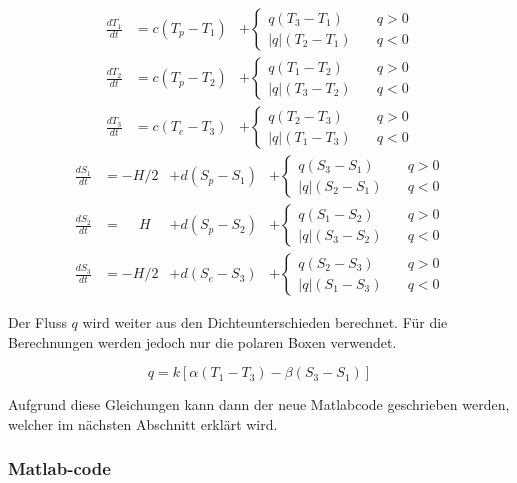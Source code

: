 \begin{equation}
\begin{aligned}
\frac{dT_1}{dt} &= c(T_p-T_1)&+ \begin{cases} q(T_3-T_1) & \quad q>0 \\ |q|(T_2-T_1) & \quad q<0 \end{cases}
\\
\frac{dT_2}{dt} &= c(T_p-T_2)&+\begin{cases} q(T_1-T_2) & \quad q>0 \\ |q|(T_3-T_2) & \quad q<0 \end{cases}
\\
\frac{dT_3}{dt} &= c(T_e-T_3)&+\begin{cases} q(T_2-T_3) & \quad q>0 \\ |q|(T_1-T_3) & \quad q<0 \end{cases}
\end{aligned}
\end{equation}
\begin{equation}
\begin{aligned}
\frac{dS_1}{dt} &= -H/2 &+ d(S_p-S_1)&+\begin{cases} q(S_3-S_1) & \quad q>0 \\ |q|(S_2-S_1) & \quad q<0 \end{cases}
\\
\frac{dS_2}{dt} &= \phantom{-}H &+ d(S_p-S_2)&+\begin{cases} q(S_1-S_2) & \quad q>0 \\ |q|(S_3-S_2) & \quad q<0 \end{cases}	
\\
\frac{dS_3}{dt} &= -H/2 &+d(S_e-S_3)&+\begin{cases} q(S_2-S_3) & \quad q>0 \\ |q|(S_1-S_3) & \quad q<0 \end{cases}
\end{aligned}
\end{equation}	

Der Fluss $q$ wird weiter aus den Dichteunterschieden berechnet. Für die Berechnungen werden jedoch nur die polaren Boxen verwendet.

\begin{equation}
q = k[\alpha(T_1-T_3)-\beta(S_3-S_1)] 
\end{equation}

Aufgrund diese Gleichungen kann dann der neue Matlabcode geschrieben werden, welcher im nächsten Abschnitt erklärt wird.


\subsubsection{Matlab-code}

